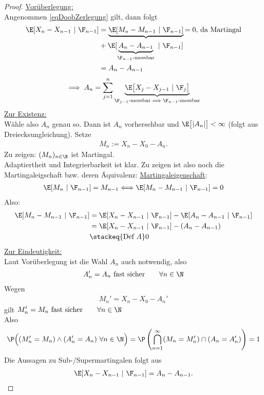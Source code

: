 \begin{proof}
\underline{Vorüberlegung:}\\
Angenommen \eqref{eqDoobZerlegung} gilt, dann folgt
\begin{align*}
\E[X_n-X_{n-1}~|~\F_{n-1}]
&=\underbrace{\E[M_n-M_{n-1}~|~\F_{n-1}]}{=0\text{, da Martingal}} \\
&+\E[\underbrace{A_n-A_{n-1}}_{\F_{n-1}\text{-messbar}}~|~\F_{n-1}]\\
&=A_n-A_{n-1}\\
\end{align*}
\[\implies
A_n=\sum\limits_{j=1}^n\underbrace{\E\big[X_j-X_{j-1}~|~\F_j\big]}_{\F_{j-1}\text{-messbar}\implies\F_{n-1}\text{-messbar}}\]
\underline{Zur Existenz:}\\
Wähle also $A_n$ genau so. Dann ist $A_n$ vorhersehbar und $\E\big[|A_n|\big]<\infty$ (folgt aus Dreiecksungleichung). Setze
\begin{align*}
M_n:=X_n-X_0-A_n.
\end{align*}
Zu zeigen: $(M_n)_{n\in\N}$ ist Martingal.\\
Adaptiertheit und Integrierbarkeit ist klar. Zu zeigen ist also noch die Martingaleigschaft bzw. deren Äquivalenz: \enter
\ul{Martingaleigenschaft}:\enter
\begin{align*}
\E[M_n~|~\F_{n-1}]=M_{n-1}\Longleftrightarrow
\E[M_n-M_{n-1}~|~\F_{n-1}]=0
\end{align*}
Also:
\begin{align*}
\E[M_{n}-M_{n-1}~|~\F_{n-1}]
&=\E[ X_n-X_{n-1}~|~\F_{n-1}]
-\E[A_n-A_{n-1}~|~\F_{n-1}]\\
&=\E[ X_n-X_{n-1}~|~\F_{n-1}]
-(A_n-A_{n-1})\\
&\stackeq{\text{Def }A}
0
\end{align*}
\underline{Zur Eindeutigkeit:}\\
Laut Vorüberlegung ist die Wahl $A_n$ auch notwendig, also 
\begin{align*}
A_n'=A_n\text{ fast sicher}\qquad\forall n\in\N
\end{align*}
Wegen
\begin{align*}
M_n'=X_n-X_0-A_n'
\end{align*}
gilt
$M_n'=M_n\text{ fast sicher}\qquad\forall n\in\N$\\
Also
\begin{align*}
\P\Big((M_n'=M_n)\wedge(A_n'=A_n)~\forall n\in\N\Big)
=\P\left(\bigcap\limits_{n=1}^\infty(M_n=M_n')\cap(A_n=A_n')\right)
=1
\end{align*}
Die Aussagen zu Sub-/Supermartingalen folgt aus
\begin{align*}
\E[X_n-X_{n-1}~|~\F_{n-1}]=A_n-A_{n-1}.
\end{align*}
\end{proof}
